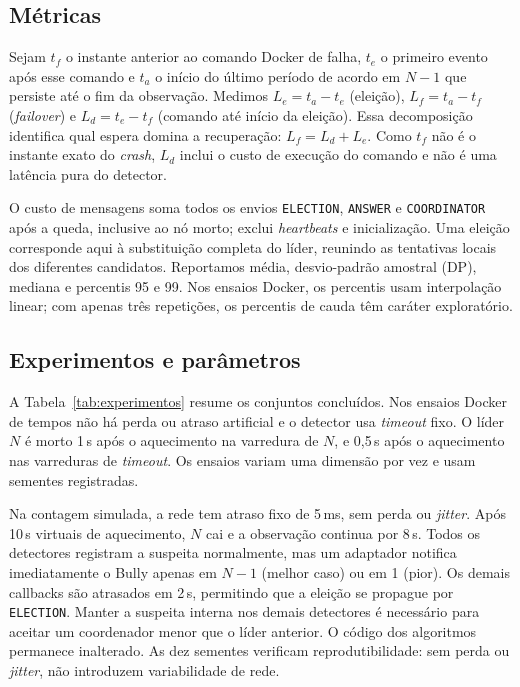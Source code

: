 \documentclass[conference]{IEEEtran}
\newcommand{\evento}[1]{\texttt{\detokenize{#1}}} %
\begin{document}
\subsection{Métricas}
\label{sec:metricas}

Sejam $t_f$ o instante anterior ao comando Docker de falha, $t_e$ o primeiro evento \evento{election_start} após esse comando e $t_a$ o início do último período de acordo em $N-1$ que persiste até o fim da observação. Medimos $L_e=t_a-t_e$ (eleição), $L_f=t_a-t_f$ (\textit{failover}) e $L_d=t_e-t_f$ (comando até início da eleição). Essa decomposição identifica qual espera domina a recuperação: $L_f=L_d+L_e$. Como $t_f$ não é o instante exato do \textit{crash}, $L_d$ inclui o custo de execução do comando e não é uma latência pura do detector.

O custo de mensagens soma todos os envios \texttt{ELECTION}, \texttt{ANSWER} e \texttt{COORDINATOR} após a queda, inclusive ao nó morto; exclui \textit{heartbeats} e inicialização. Uma eleição corresponde aqui à substituição completa do líder, reunindo as tentativas locais dos diferentes candidatos. Reportamos média, desvio-padrão amostral (DP), mediana e percentis 95 e 99. Nos ensaios Docker, os percentis usam interpolação linear; com apenas três repetições, os percentis de cauda têm caráter exploratório.

\subsection{Experimentos e parâmetros}
\label{sec:parametros}

A Tabela~\ref{tab:experimentos} resume os conjuntos concluídos. Nos ensaios Docker de tempos não há perda ou atraso artificial e o detector usa \textit{timeout} fixo. O líder $N$ é morto 1\,s após o aquecimento na varredura de $N$, e 0,5\,s após o aquecimento nas varreduras de \textit{timeout}. Os ensaios variam uma dimensão por vez e usam sementes registradas.

Na contagem simulada, a rede tem atraso fixo de 5\,ms, sem perda ou \textit{jitter}. Após 10\,s virtuais de aquecimento, $N$ cai e a observação continua por 8\,s. Todos os detectores registram a suspeita normalmente, mas um adaptador notifica imediatamente o Bully apenas em $N-1$ (melhor caso) ou em 1 (pior). Os demais callbacks são atrasados em 2\,s, permitindo que a eleição se propague por \texttt{ELECTION}. Manter a suspeita interna nos demais detectores é necessário para aceitar um coordenador menor que o líder anterior. O código dos algoritmos permanece inalterado. As dez sementes verificam reprodutibilidade: sem perda ou \textit{jitter}, não introduzem variabilidade de rede.
\end{document}
